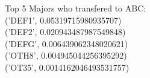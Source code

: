 Top 5 Majors who transfered to ABC: \\
('DEF1', 0.05319715980935707)\\
('DEF2', 0.020943487987549848)\\
('DEFG', 0.006439062348020621)\\
('OTH8', 0.004945044256395292)\\
('OT35', 0.0014162046493531757)\\
